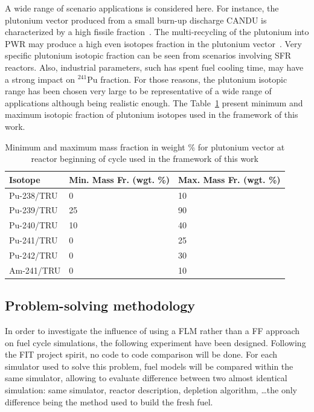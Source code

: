 A wide range of scenario applications is considered here. For instance, the
plutonium vector produced from a small burn-up discharge CANDU is characterized
by a high fissile fraction~\cite{Guillemin_2010}. The multi-recycling of the
plutonium into PWR may produce a high even isotopes fraction in the plutonium
vector~\cite{Courtin_2016}. Very specific plutonium isotopic fraction can be
seen from scenarios involving SFR reactors. Also, industrial parameters, such
has spent fuel cooling time, may have a strong impact on $^{241}$Pu fraction.
For those reasons, the plutonium isotopic range has been chosen very large to be
representative of a wide range of applications although being realistic enough.
The Table~\ref{Tab:PuVector} present minimum and maximum isotopic fraction of
plutonium isotopes used in the framework of this work.

\begin{table}[h]
\centering
\begin{tabular}{ |l|l|l| }
  \hline
  Isotope & Min. Mass Fr. (wgt. \%) & Max. Mass Fr. (wgt. \%) \\
  \hline
  Pu-238/TRU & 0  & 10 \\
  \hline
  Pu-239/TRU & 25 & 90 \\
  \hline
  Pu-240/TRU & 10 & 40 \\
  \hline
  Pu-241/TRU & 0  & 25 \\
  \hline
  Pu-242/TRU & 0  & 30 \\
  \hline
  Am-241/TRU & 0  & 10 \\
  \hline
\end{tabular}
\label{Tab:PuVector}
\caption{Minimum and maximum mass fraction in weight \% for plutonium vector at
        reactor beginning of cycle used in the framework of this work}
\end{table}

\subsection{Problem-solving methodology}

In order to investigate the influence of using a \gls{FLM} rather than a
\gls{FF} approach on fuel cycle simulations, the following experiment have been
designed. Following the FIT project spirit, no code to code comparison will be
done. For each simulator used to solve this problem, fuel models will be
compared within the same simulator, allowing to evaluate difference between two
almost identical simulation: same simulator, reactor description, depletion
algorithm, \ldots the only difference being the method used to build the fresh fuel.

